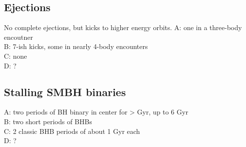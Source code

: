 \documentclass[english, apj]{emulateapj}
\begin{document}
\subsection{Ejections}
No complete ejections, but kicks to higher energy orbits.
\noindent A: one in a three-body encoutner\\
B: 7-ish kicks, some in nearly 4-body encounters\\
C: none\\
D: ?\\

\subsection{Stalling SMBH binaries}
A: two periods of BH binary in center for > Gyr, up to 6 Gyr\\
B: two short periods of BHBs\\
C: 2 classic BHB periods of about 1 Gyr each\\
D: ?
\end{document}
